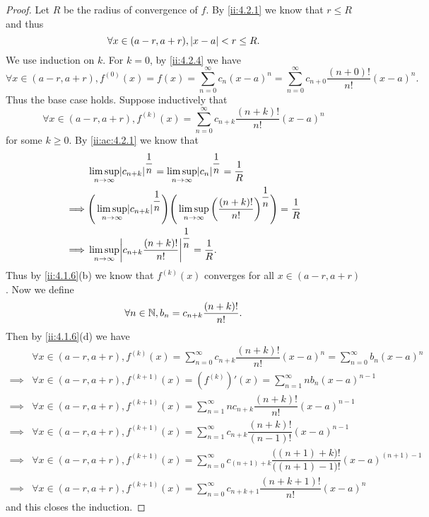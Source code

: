 \begin{proof}
  Let \(R\) be the radius of convergence of \(f\).
  By \cref{ii:4.2.1} we know that \(r \leq R\) and thus
  \[
    \forall x \in (a - r, a + r), \left\lvert x - a\right\rvert < r \leq R.
  \]
  We use induction on \(k\).
  For \(k = 0\), by \cref{ii:4.2.4} we have
  \[
    \forall x \in (a - r, a + r), f^{(0)}(x) = f(x) = \sum_{n = 0}^\infty c_n (x - a)^n = \sum_{n = 0}^\infty c_{n + 0} \dfrac{(n + 0)!}{n!} (x - a)^n.
  \]
  Thus the base case holds.
  Suppose inductively that
  \[
    \forall x \in (a - r, a + r), f^{(k)}(x) = \sum_{n = 0}^\infty c_{n + k} \dfrac{(n + k)!}{n!} (x - a)^n
  \]
  for some \(k \geq 0\).
  By \cref{ii:ac:4.2.1} we know that
  \begin{align*}
             & \limsup_{n \to \infty} \abs{c_{n + k}}^{\dfrac{1}{n}} = \limsup_{n \to \infty} \abs{c_n}^{\dfrac{1}{n}} = \dfrac{1}{R}                                              \\
    \implies & \Bigg(\limsup_{n \to \infty} \abs{c_{n + k}}^{\dfrac{1}{n}}\Bigg) \Bigg(\limsup_{n \to \infty} \bigg(\dfrac{(n + k)!}{n!}\bigg)^{\dfrac{1}{n}}\Bigg) = \dfrac{1}{R} \\
    \implies & \limsup_{n \to \infty} \abs{c_{n + k} \dfrac{(n + k)!}{n!}}^{\dfrac{1}{n}} = \dfrac{1}{R}.
  \end{align*}
  Thus by \cref{ii:4.1.6}(b) we know that \(f^{(k)}(x)\) converges for all \(x \in (a - r, a + r)\).
  Now we define
  \[
    \forall n \in \mathbb{N}, b_n = c_{n + k} \dfrac{(n + k)!}{n!}.
  \]
  Then by \cref{ii:4.1.6}(d) we have
  \begin{align*}
             & \forall x \in (a - r, a + r), f^{(k)}(x) = \sum_{n = 0}^\infty c_{n + k} \dfrac{(n + k)!}{n!} (x - a)^n = \sum_{n = 0}^\infty b_n (x - a)^n                     \\
    \implies & \forall x \in (a - r, a + r), f^{(k + 1)}(x) = (f^{(k)})'(x) = \sum_{n = 1}^\infty n b_n (x - a)^{n - 1}                                                        \\
    \implies & \forall x \in (a - r, a + r), f^{(k + 1)}(x) = \sum_{n = 1}^\infty n c_{n + k} \dfrac{(n + k)!}{n!} (x - a)^{n - 1}                                             \\
    \implies & \forall x \in (a - r, a + r), f^{(k + 1)}(x) = \sum_{n = 1}^\infty c_{n + k} \dfrac{(n + k)!}{(n - 1)!} (x - a)^{n - 1}                                         \\
    \implies & \forall x \in (a - r, a + r), f^{(k + 1)}(x) = \sum_{n = 0}^\infty c_{(n + 1) + k} \dfrac{\big((n + 1) + k\big)!}{\big((n + 1) - 1\big)!} (x - a)^{(n + 1) - 1} \\
    \implies & \forall x \in (a - r, a + r), f^{(k + 1)}(x) = \sum_{n = 0}^\infty c_{n + k + 1} \dfrac{(n + k + 1)!}{n!} (x - a)^n
  \end{align*}
  and this closes the induction.
\end{proof}

